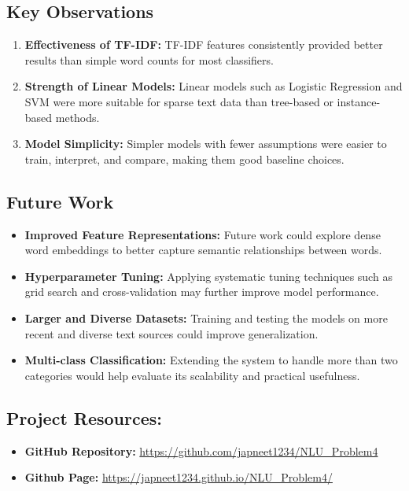 \documentclass[12pt]{article}
\begin{document}
\subsection{Key Observations}
\begin{enumerate}
    \item \textbf{Effectiveness of TF-IDF:} TF-IDF features consistently provided better results than simple word counts for most classifiers.
    \item \textbf{Strength of Linear Models:} Linear models such as Logistic Regression and SVM were more suitable for sparse text data than tree-based or instance-based methods.
    \item \textbf{Model Simplicity:} Simpler models with fewer assumptions were easier to train, interpret, and compare, making them good baseline choices.
\end{enumerate}

\subsection{Future Work}
\begin{itemize}
    \item \textbf{Improved Feature Representations:} Future work could explore dense word embeddings to better capture semantic relationships between words.
    \item \textbf{Hyperparameter Tuning:} Applying systematic tuning techniques such as grid search and cross-validation may further improve model performance.
    \item \textbf{Larger and Diverse Datasets:} Training and testing the models on more recent and diverse text sources could improve generalization.
    \item \textbf{Multi-class Classification:} Extending the system to handle more than two categories would help evaluate its scalability and practical usefulness.
\end{itemize}



\subsection{Project Resources:}
\begin{itemize}
    \item \textbf{GitHub Repository:} \url{https://github.com/japneet1234/NLU_Problem4}
    \item \textbf{Github Page:} \url{https://japneet1234.github.io/NLU_Problem4/}
\end{itemize}
\end{document}
